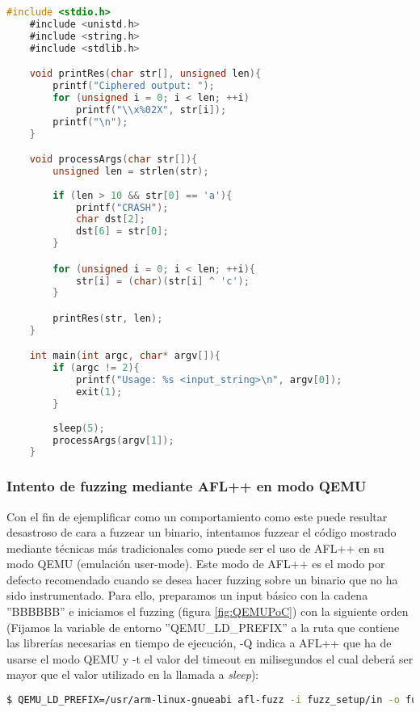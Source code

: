 \begin{lstlisting}[language=C, caption=Código de ejemplo a fuzzear., captionpos=b,
    frame=single, breaklines, showstringspaces=false]
    #include <stdio.h>
    #include <unistd.h>
    #include <string.h>
    #include <stdlib.h>

    void printRes(char str[], unsigned len){
        printf("Ciphered output: ");
        for (unsigned i = 0; i < len; ++i)
            printf("\\x%02X", str[i]);
        printf("\n");
    }

    void processArgs(char str[]){
        unsigned len = strlen(str);
        
        if (len > 10 && str[0] == 'a'){
            printf("CRASH");
            char dst[2];
            dst[6] = str[0];
        }

        for (unsigned i = 0; i < len; ++i){
            str[i] = (char)(str[i] ^ 'c');
        }

        printRes(str, len);
    }

    int main(int argc, char* argv[]){
        if (argc != 2){
            printf("Usage: %s <input_string>\n", argv[0]);
            exit(1);
        }
        
        sleep(5);
        processArgs(argv[1]);
    }
\end{lstlisting}

\subsubsection{Intento de fuzzing mediante AFL++ en modo QEMU}
Con el fin de ejemplificar como un comportamiento como este puede resultar desastroso de cara a fuzzear un binario, intentamos fuzzear el 
código mostrado mediante técnicas más tradicionales como puede ser el uso de AFL++ en su modo QEMU (emulación user-mode). Este modo de AFL++ es el 
modo por defecto recomendado cuando se desea hacer fuzzing sobre un binario que no ha sido instrumentado. Para ello, preparamos un input 
básico con la cadena ''BBBBBB'' e iniciamos el fuzzing (figura \ref{fig:QEMUPoC}) con la siguiente orden (Fijamos la variable de entorno
''QEMU\_LD\_PREFIX'' a la ruta que contiene las librerías necesarias en tiempo de ejecución, -Q indica a AFL++ que ha de usarse el modo QEMU y
-t el valor del timeout en milisegundos el cual deberá ser mayor que el valor utilizado en la llamada a \textit{sleep}):

\begin{lstlisting}[language=bash]
    $ QEMU_LD_PREFIX=/usr/arm-linux-gnueabi afl-fuzz -i fuzz_setup/in -o fuzz_setup/out -Q -t 7000 -- ./bin/main_arm @@
\end{lstlisting}

